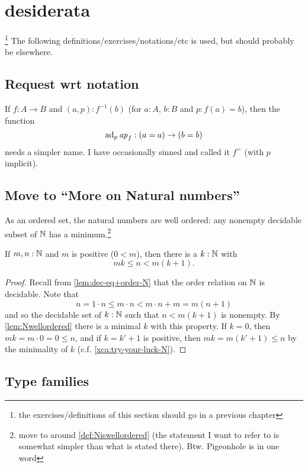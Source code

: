 \section{desiderata}\footnote{the exercises/definitions of this section should go in a previous chapter}
The following definitions/exercises/notations/etc is used, but should probably be elsewhere.

\subsection{Request wrt notation}
\label{sec:requestnotation}

If $f:A\to B$ and $(a,p):f^{-1}(b)$ (for $a:A$, $b:B$ and $p:f(a)=b$), then the function
$$\mathrm{ad}_p\mathop{{\it ap}_{f}}:(a=a)\to(b=b)$$
needs a simpler name.  I have occasionally sinned and called it $f^=$ (with $p$ implicit).  

\subsection{Move to ``More on Natural numbers''}
\label{sec:moonN}
\begin{lemma}\label{lem:Nwellordered}
  As an ordered set, the natural numbers are well ordered: any nonempty decidable subset of $\mathbb{N}$ has a minimum.\footnote{move to around \cref{def:Niswellordered} (the statement I want to refer to is somewhat simpler than what is stated there).  Btw. Pigeonhole is in one word}
\end{lemma}
\begin{corollary}
  \label{cor:arch}
  If $m,n:\mathbb{N}$ and $m$ is positive (\ie $0<m$), then there is a $k:\mathbb{N}$ with 
$$mk\leq n<m(k+1).$$
\end{corollary}
\begin{proof}
  Recall from \cref{lem:dec-eq+order-N} that the order relation on $\mathbb{N}$ is decidable.
  Note that $$n=1\cdot n\leq m\cdot n<m\cdot n+m=m(n+1)$$ and so the decidable set of $k:\mathbb{N}$ such that $n<m(k+1)$ is nonempty. By \cref{lem:Nwellordered} there is a minimal $k$ with this property.  If $k=0$, then $mk=m\cdot 0=0\leq n$, and if $k=k'+1$  is positive, then $mk=m(k'+1)\leq n$ by the minimality of $k$ (c.f. \cref{xca:try-your-luck-N}).  
\end{proof}



\subsection{Type families}
\label{sec:typefam}

